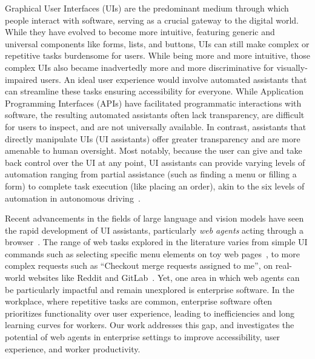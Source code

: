 \documentclass{article}
\theoremstyle{plain}
\theoremstyle{definition}
\theoremstyle{remark}
\begin{document}
Graphical User Interfaces (UIs) are the predominant medium through which people interact with software, serving as a crucial gateway to the digital world. 
While they have evolved to become more intuitive, featuring generic and universal components like forms, lists, and buttons, UIs can still make complex or repetitive tasks burdensome for users. While being more and more intuitive, those complex UIs also became inadvertedly more and more discriminative for visually-impaired users.
An ideal user experience would involve automated assistants that can streamline these tasks ensuring accessibility for everyone.
While Application Programming Interfaces (APIs) have facilitated programmatic interactions with software, the resulting automated assistants often lack transparency, are difficult for users to inspect, and are not universally available.
In contrast, assistants that directly manipulate UIs (UI assistants) offer greater transparency and are more amenable to human oversight.
Most notably, because the user can give and take back control over the UI at any point, UI assistants can provide varying levels of automation ranging from partial assistance (such as finding a menu or filling a form) to complete task execution (like placing an order), akin to the six levels of automation in autonomous driving~\citep{sae/levels-automation}.

Recent advancements in the fields of large language and vision models have seen the rapid development of UI assistants, particularly \emph{web agents} acting through a browser~\citep{furuta2023multimodal,kim2023rciagent,gur2023webagent}. The range of web tasks explored in the literature varies from simple UI commands such as selecting specific menu elements on toy web pages~\citep{LiuL18MiniWoB, Shi2017MiniWoB}, to more complex requests such as ``Checkout merge requests assigned to me'', on real-world websites like Reddit and GitLab~\citep{zhou2023webarena}. Yet, one area in which web agents can be particularly impactful and remain unexplored is enterprise software. In the workplace, where repetitive tasks are common, enterprise software often prioritizes functionality over user experience, leading to inefficiencies and long learning curves for workers.
Our work addresses this gap, and investigates the potential of web agents in enterprise settings to improve accessibility, user experience, and worker productivity.
\end{document}
